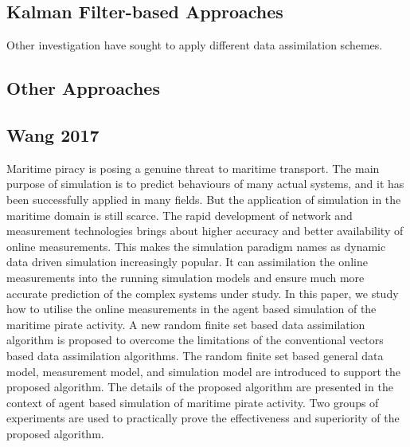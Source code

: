 \subsection{Kalman Filter-based Approaches}\label{sub:lit_rev:da_abm:kf}

Other investigation have sought to apply different data assimilation schemes.

\subsection{Other Approaches}\label{sub:lit_rev:da_abm:other}

\subsection{Wang 2017}

Maritime piracy is posing a genuine threat to maritime transport.
The main purpose of simulation is to predict behaviours of many actual systems,
and it has been successfully applied in many fields.
But the application of simulation in the maritime domain is still scarce.
The rapid development of network and measurement technologies brings about
higher accuracy and better availability of online measurements.
This makes the simulation paradigm names as dynamic data driven simulation
increasingly popular.
It can assimilation the online measurements into the running simulation models
and ensure much more accurate prediction of the complex systems under study.
In this paper, we study how to utilise the online measurements in the agent
based simulation of the maritime pirate activity.
A new random finite set based data assimilation algorithm is proposed to
overcome the limitations of the conventional vectors based data assimilation
algorithms.
The random finite set based general data model, measurement model, and
simulation model are introduced to support the proposed algorithm.
The details of the proposed algorithm are presented in the context of agent
based simulation of maritime pirate activity.
Two groups of experiments are used to practically prove the effectiveness and
superiority of the proposed algorithm.


